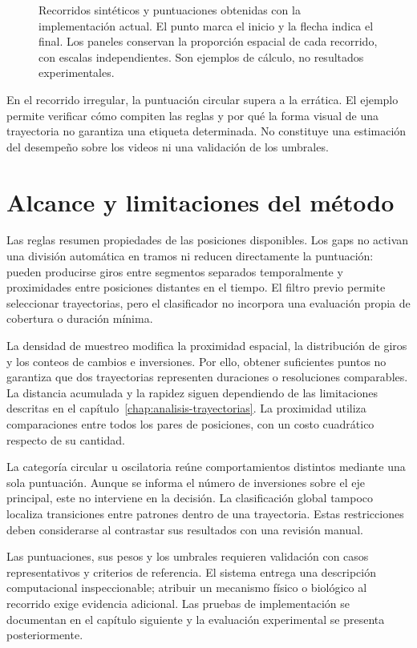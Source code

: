 \begin{figure}[H]
 \caption{Recorridos sintéticos y puntuaciones obtenidas con la implementación actual. El punto marca el inicio y la flecha indica el final. Los paneles conservan la proporción espacial de cada recorrido, con escalas independientes. Son ejemplos de cálculo, no resultados experimentales.}
 \label{fig:ejemplos-clasificacion}
\end{figure}

En el recorrido irregular, la puntuación circular supera a la errática. El ejemplo permite verificar cómo compiten las reglas y por qué la forma visual de una trayectoria no garantiza una etiqueta determinada. No constituye una estimación del desempeño sobre los videos ni una validación de los umbrales.

\section{Alcance y limitaciones del método}

Las reglas resumen propiedades de las posiciones disponibles. Los gaps no activan una división automática en tramos ni reducen directamente la puntuación: pueden producirse giros entre segmentos separados temporalmente y proximidades entre posiciones distantes en el tiempo. El filtro previo permite seleccionar trayectorias, pero el clasificador no incorpora una evaluación propia de cobertura o duración mínima.

La densidad de muestreo modifica la proximidad espacial, la distribución de giros y los conteos de cambios e inversiones. Por ello, obtener suficientes puntos no garantiza que dos trayectorias representen duraciones o resoluciones comparables. La distancia acumulada y la rapidez siguen dependiendo de las limitaciones descritas en el capítulo~\ref{chap:analisis-trayectorias}. La proximidad utiliza comparaciones entre todos los pares de posiciones, con un costo cuadrático respecto de su cantidad.

La categoría circular u oscilatoria reúne comportamientos distintos mediante una sola puntuación. Aunque se informa el número de inversiones sobre el eje principal, este no interviene en la decisión. La clasificación global tampoco localiza transiciones entre patrones dentro de una trayectoria. Estas restricciones deben considerarse al contrastar sus resultados con una revisión manual.

Las puntuaciones, sus pesos y los umbrales requieren validación con casos representativos y criterios de referencia. El sistema entrega una descripción computacional inspeccionable; atribuir un mecanismo físico o biológico al recorrido exige evidencia adicional. Las pruebas de implementación se documentan en el capítulo siguiente y la evaluación experimental se presenta posteriormente.
